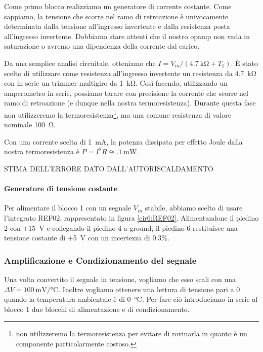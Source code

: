 Come primo blocco realizziamo un generatore di corrente costante.
Come sappiamo, la tensione che scorre nel ramo di retroazione è univocamente determinata dalla tensione all'ingresso invertente e dalla resistenza posta all'ingresso invertente.
Dobbiamo stare attenti che il nostro opamp non vada in saturazione o avremo una dipendenza della corrente dal carico.

Da una semplice analisi circuitale, otteniamo che $I=V_{in}/(\SI{4.7}{\kohm}+T_1)$.
È stato scelto di utilizzare come resistenza all'ingresso invertente un resistenza da \SI{4.7}{\kilo\ohm} con in serie un trimmer multigiro da \SI{1}{\kilo\ohm}.
Così facendo, utilizzando un amperometro in serie, possiamo tarare con precisione la corrente che scorre nel ramo di retroazione (e dunque nella nostra termoresistenza).
Durante questa fase non utilizzeremo la termoresistenza\footnote{non utilizzeremo la termoresistenza per evitare di rovinarla in quanto è un componente particolarmente costoso.}, ma una comune resistenza di valore nominale \SI{100}{\ohm}.

Con una corrente scelta di \SI{1}{\milli\ampere}, la potenza dissipata per effetto Joule dalla nostra termoresistenza è $P=I^2 R \cong \SI{.1}{\mW}$.

STIMA DELL'ERRORE DATO DALL'AUTORISCALDAMENTO

\paragraph{Generatore di tensione costante\newline}

Per alimentare il blocco 1 con un segnale $V_{in}$ stabile, abbiamo scelto di usare l'integrato REF02, rappresentato in figura \ref{cir6:REF02}.
Alimentandone il piedino 2 con +\SI{15}{\volt} e collegando il piedino 4 a ground, il piedino 6 restituisce una tensione costante di +\SI{5}{\volt} con un incertezza di \num{0.3}$\%$.
\newpage

\subsubsection{Amplificazione e Condizionamento del segnale}
Una volta convertito il segnale in tensione, vogliamo che esso scali con una $\Delta V=\SI{100}{\milli\volt}/\si{\celsius}$.
Inoltre vogliamo ottenere una lettura di tensione pari a \num{0} quando la temperatura ambientale è di \SI{0}{\celsius}.
Per fare ciò introduciamo in serie al blocco 1 due blocchi di alimentazione e di condizionamento.

